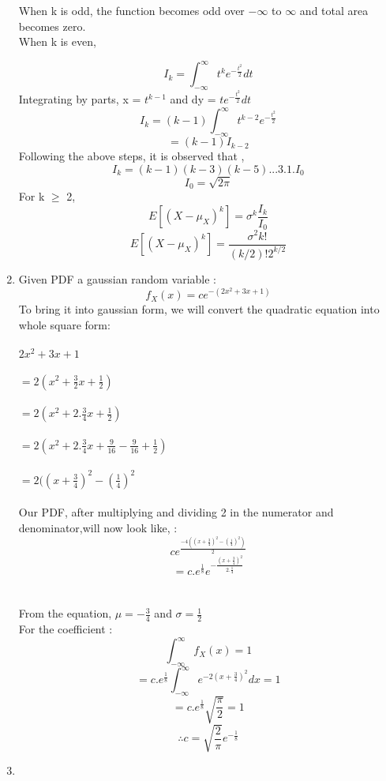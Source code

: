 \documentclass{article}
\begin{document}
\begin{enumerate}
When k is odd, the function becomes odd over $-\infty$ to $\infty$ and total area becomes zero.\\
When k is even, 

$$I_{k} = \int_{-\infty}^{\infty} t^{k} e^{-\frac{t^2}{2}} dt $$
Integrating by parts, x = $t^{k-1}$ and dy = $te^{-\frac{t^2}{2}}dt$
$$I_{k}=(k-1)\int_{-\infty}^{\infty} t^{k-2} e^{-\frac{t^2}{2}} $$
$$= (k-1)I_{k-2}$$
Following the above steps, it is observed that , 
$$I_{k}= (k-1)(k-3)(k-5)...3.1.I_{0}$$
$$I_{0}=\sqrt{2\pi}$$
For k $\geq$ 2,
$$E[(X-\mu_{X})^k] = \sigma^{k} \frac{I_{k}}{I_{0}}$$ 
$$E[(X-\mu_{X})^k] = \frac{\sigma^2 k!}{(k/2)!2^{k/2}}$$
 
\newpage
\item
Given PDF  a gaussian random variable :
$$f_{X}(x)= c e^{-(2x^2+3x+1)}$$
To bring it into gaussian form, we will convert the quadratic equation into whole square form:\\
\\
$2x^2+3x+1$ \\ \\$= 2(x^2+\frac{3}{2}x+\frac{1}{2})$\\ \\
	$=2(x^2+2.\frac{3}{4}x+\frac{1}{2})$\\ \\
$=2(x^2+2.\frac{3}{4}x+\frac{9}{16}-\frac{9}{16}+\frac{1}{2})$ \\ \\
$= 2((x+\frac{3}{4})^2 - (\frac{1}{4})^2$ \\ \\
Our PDF, after multiplying and dividing 2 in the numerator and denominator,will now look like, :\\
\Large $$c e^{\frac{-4((x+\frac{3}{4})^2 - (\frac{1}{4})^2)}{2}}$$
  $$=c . e^{\frac{1}{8}} e ^{-\frac{(x+\frac{3}{4})^2}{2.\frac{1}{4}}}$$\\
\\
\large
From the equation, $\mu= -\frac{3}{4}$ and $\sigma = \frac{1}{2}$\\
For the coefficient :
$$\int_{-\infty}^{\infty} f_{X}(x) =1$$
$$=c.e^{\frac{1}{8}} \int_{-\infty}^{\infty} e^{-2(x+\frac{3}{4})^2}dx = 1$$
$$=c.e^{\frac{1}{8}}\sqrt{\frac{\pi}{2}}=1 $$
$$\therefore c= \sqrt{\frac{2}{\pi}}e^{-\frac{1}{8}}$$
\item


\end{enumerate}
\end{document}
